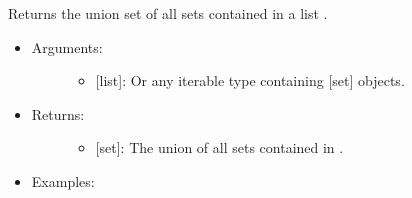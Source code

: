 \documentclass[letterpaper,10pt,english]{sphinxmanual}
\begin{document}

\begin{fulllineitems}
\label{\detokenize{sets:data_tools.sets.multi_union}}
Returns the union set of all sets contained in a list .
\begin{itemize}
\item {} \begin{description}
\item[{Arguments:}] \leavevmode\begin{itemize}
\item {} 
 {[}list{]}: Or any iterable type containing {[}set{]} objects.

\end{itemize}

\end{description}

\item {} \begin{description}
\item[{Returns:}] \leavevmode\begin{itemize}
\item {} 
{[}set{]}: The union of all sets contained in .

\end{itemize}

\end{description}

\item {} \begin{description}
\item[{Examples:}] \leavevmode
{}%
\begin{sphinxVerbatim}[commandchars=\\\{\}]
    
    
    
\PYG{p}{[}  \PYG{p}{]}
\end{sphinxVerbatim}

\end{description}

\end{itemize}

\end{fulllineitems}
\end{document}
